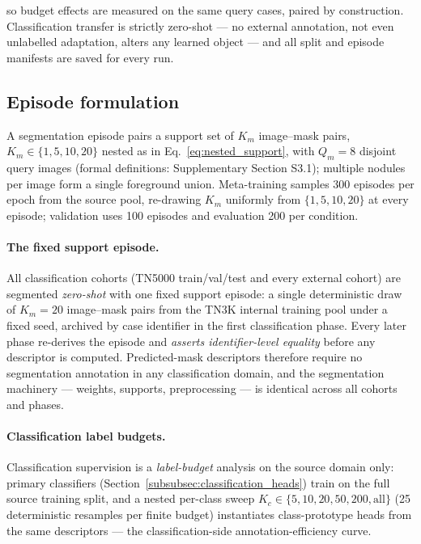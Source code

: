 \documentclass[jimh,article,submit,moreauthors,pdftex]{Definitions/tsp}
\begin{document}
so budget effects are measured on the same query cases, paired by
construction. Classification transfer is strictly zero-shot --- no
external annotation, not even unlabelled adaptation, alters any learned
object --- and all split and episode manifests are saved for every run.

\subsection{Episode formulation}
\label{subsec:episode_formulation}

A segmentation episode pairs a support set of $K_m$ image--mask pairs,
$K_m \in \{1, 5, 10, 20\}$ nested as in Eq.~\eqref{eq:nested_support},
with $Q_m = 8$ disjoint query images (formal definitions: Supplementary
Section S3.1); multiple nodules per image form a single foreground
union. Meta-training samples 300 episodes per epoch from the source
pool, re-drawing $K_m$ uniformly from $\{1,5,10,20\}$ at every episode; validation uses 100
episodes and evaluation 200 per condition.

\paragraph{The fixed support episode.}
All classification cohorts (TN5000 train/val/test and every external
cohort) are segmented \emph{zero-shot} with one fixed support episode:
a single deterministic draw of $K_m = 20$ image--mask pairs from the
TN3K internal training pool under a fixed seed, archived by case
identifier in the first classification phase. Every later phase
re-derives the episode and \emph{asserts identifier-level equality}
before any descriptor is computed. Predicted-mask descriptors therefore
require no segmentation annotation in any classification domain, and
the segmentation machinery --- weights, supports, preprocessing --- is
identical across all cohorts and phases.

\paragraph{Classification label budgets.}
Classification supervision is a \emph{label-budget} analysis on the
source domain only: primary classifiers
(Section~\ref{subsubsec:classification_heads}) train on the full source
training split, and a nested per-class sweep
$K_c \in \{5, 10, 20, 50, 200, \mathrm{all}\}$ (25 deterministic
resamples per finite budget) instantiates class-prototype heads from
the same descriptors --- the classification-side annotation-efficiency
curve.
\end{document}
